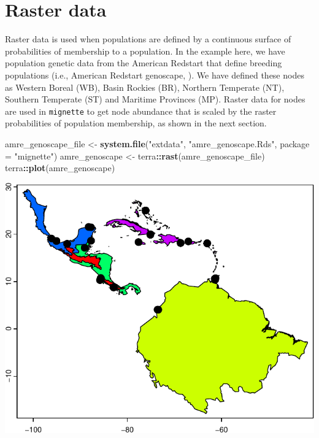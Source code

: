 \documentclass[
]{book}
\newenvironment{Shaded}{\begin{snugshade}}{\end{snugshade}}
\newcommand{\AttributeTok}[1]{\textcolor[rgb]{0.13,0.29,0.53}{#1}}
\newcommand{\FunctionTok}[1]{\textcolor[rgb]{0.13,0.29,0.53}{\textbf{#1}}}
\newcommand{\NormalTok}[1]{#1}
\newcommand{\OtherTok}[1]{\textcolor[rgb]{0.56,0.35,0.01}{#1}}
\newcommand{\SpecialCharTok}[1]{\textcolor[rgb]{0.81,0.36,0.00}{\textbf{#1}}}
\newcommand{\StringTok}[1]{\textcolor[rgb]{0.31,0.60,0.02}{#1}}
\begin{document}
\hypertarget{raster-data}{%
\section{Raster data}\label{raster-data}}

Raster data is used when populations are defined by a continuous surface of probabilities of membership to a population. In the example here, we have population genetic data from the American Redstart that define breeding populations (i.e., American Redstart genoscape, \citep{desaix2023low}). We have defined these nodes as Western Boreal (WB), Basin Rockies (BR), Northern Temperate (NT), Southern Temperate (ST) and Maritime Provinces (MP). Raster data for nodes are used in \texttt{mignette} to get node abundance that is scaled by the raster probabilities of population membership, as shown in the next section.

\begin{Shaded}
\begin{Highlighting}[]
\NormalTok{amre\_genoscape\_file }\OtherTok{\textless{}{-}} \FunctionTok{system.file}\NormalTok{(}\StringTok{"extdata"}\NormalTok{, }\StringTok{"amre\_genoscape.Rds"}\NormalTok{, }\AttributeTok{package =} \StringTok{"mignette"}\NormalTok{)}
\NormalTok{amre\_genoscape }\OtherTok{\textless{}{-}}\NormalTok{ terra}\SpecialCharTok{::}\FunctionTok{rast}\NormalTok{(amre\_genoscape\_file)}
\NormalTok{terra}\SpecialCharTok{::}\FunctionTok{plot}\NormalTok{(amre\_genoscape)}
\end{Highlighting}
\end{Shaded}

\includegraphics{Mignette_files/figure-latex/unnamed-chunk-13-1.pdf}
\end{document}
